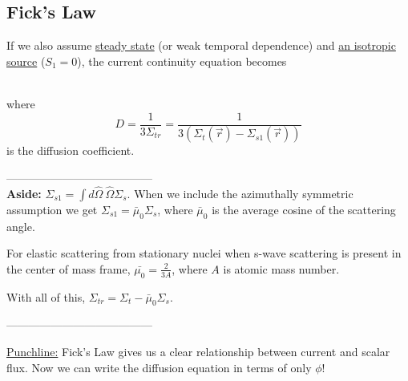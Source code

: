 \documentclass[12pt]{article}
\newif\ifeqns
\newlength{\up}
\newcommand{\Macro}{\ensuremath{\Sigma}}
\newcommand{\vOmega}{\ensuremath{\hat{\Omega}}}
\begin{document}
\subsection*{Fick's Law}
If we also assume \underline{steady state} (or weak temporal dependence) and \underline{an isotropic source} ($S_1 = 0$), the current continuity equation becomes
%
\ifeqns
\begin{align*}
\frac{1}{3} \nabla \phi(\vec{r}, t) +
\Sigma_{tr}  &\vec{J}(\vec{r}) = 0 \\
&\boxed{\vec{J}(\vec{r}) = -\frac{1}{3\Sigma_{tr}} \nabla \phi(\vec{r}) = -D\nabla \phi(\vec{r}) } \qquad \text{Fick's Law}
\end{align*}
\else
\vspace*{7em}\\
\fi
%
where
\[D = \frac{1}{3\Macro_{tr}} = \frac{1}{3(\Macro_t(\vec{r}) - \Macro_{s1}(\vec{r}))}\] 
is the diffusion coefficient. 

 ---------------------------------------\\
\textbf{Aside:} $\Macro_{s1}  = \int d\vOmega \:\vOmega \Macro_{s}$. When we include the azimuthally symmetric assumption we get $\Macro_{s1} = \bar{\mu}_{0}\Macro_{s}$, where $\bar{\mu}_{0}$ is the average cosine of the scattering angle.

For elastic scattering from stationary nuclei when s-wave scattering is present in the center of mass frame, $\bar{\mu_{0}} = \frac{2}{3A}$, where $A$ is atomic mass number. 

With all of this, $\Sigma_{tr} = \Sigma_t - \bar{\mu}_0 \Sigma_s$.

%
 ---------------------------------------

\underline{Punchline:} Fick's Law gives us a clear relationship between current and scalar flux. Now we can write the diffusion equation in terms of only $\phi$!
%
\ifeqns
\begin{equation}
\boxed{\frac{1}{v}\frac{\partial}{\partial t}\phi(\vec{r}, t) 
-\nabla \cdot D\nabla \phi(\vec{r}, t) + 
\Sigma_a \phi(\vec{r}, t) =
\nu \Sigma_f \phi(\vec{r}, t) +
S(\vec{r}, t)} \:. \nonumber
\end{equation}
\else
\vspace*{3em}\\
\fi
\end{document}
